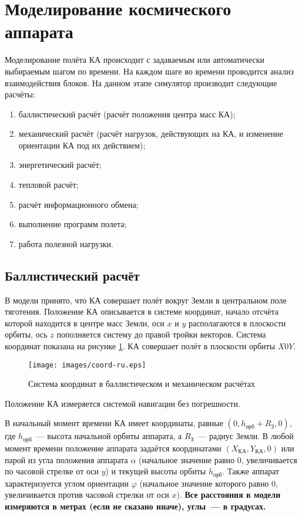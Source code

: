 \documentclass[12pt,a4paper]{article}
\begin{document}
\section{Моделирование космического аппарата}

Моделирование полёта КА происходит с задаваемым или автоматически выбираемым шагом по
времени. На каждом шаге во времени проводится анализ взаимодействия блоков. На данном
этапе симулятор производит следующие расчёты:

\begin{enumerate}
  \item баллистический расчёт (расчёт положения центра масс КА);
  \item механический расчёт (расчёт нагрузок, действующих на КА, и изменение ориентации КА под их действием);
  \item энергетический расчёт;
  \item тепловой расчёт;
  \item расчёт информационного обмена;
  \item выполнение программ полета;
  \item работа полезной нагрузки.
\end{enumerate}

\subsection{Баллистический расчёт}

В модели принято, что КА совершает полёт вокруг Земли в центральном поле
тяготения. Положение КА описывается в системе координат, начало отсчёта которой находится
в центре масс Земли, оси $x$ и $y$ располагаются в плоскости орбиты, ось $z$ пополняется систему
до правой тройки векторов. Система координат показана на рисунке \ref{Pic:Coord}. КА
совершает полёт в плоскости орбиты $X0Y$.

\begin{figure}[tbh]
  \begin{center}
    \texttt{[image: images/coord-ru.eps]}
    \caption{Система координат в баллистическом и механическом расчётах}
    \label{Pic:Coord}
  \end{center}
\end{figure}

Положение КА измеряется системой навигации без погрешности.

В начальный момент времени КА имеет координаты, равные $(0, h_{\text{орб}} + R_{\text{З}},
0)$, где $h_{\text{орб}}$~--– высота начальной орбиты аппарата, а $R_{\text{З}}$~--–
радиус Земли. В любой момент времени положение аппарата задаётся координатами
$(X_{\text{КА}}, Y_{\text{КА}}, 0)$ или парой из угла положения аппарата $\alpha$
(начальное значение равно 0, увеличивается по часовой стрелке от оси $y$) и текущей высоты орбиты
$h_{\text{орб}}$. Также аппарат характеризуется углом ориентации $\varphi$ (начальное значение
которого равно 0, увеличивается против часовой стрелки от оси $x$). \textbf{Все расстояния в модели
измеряются в метрах (если не сказано иначе), углы~--- в градусах.}
\end{document}
